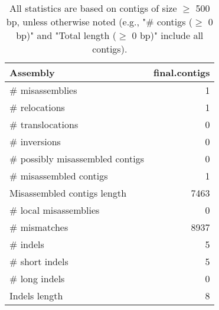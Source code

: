 \documentclass[12pt,a4paper]{article}
\begin{document}
\begin{table}[ht]
\begin{center}
\caption{All statistics are based on contigs of size $\geq$ 500 bp, unless otherwise noted (e.g., "\# contigs ($\geq$ 0 bp)" and "Total length ($\geq$ 0 bp)" include all contigs).}
\begin{tabular}{|l*{1}{|r}|}
\hline
Assembly & final.contigs \\ \hline
\# misassemblies & 1 \\ \hline
\hspace{5mm}\# relocations & 1 \\ \hline
\hspace{5mm}\# translocations & 0 \\ \hline
\hspace{5mm}\# inversions & 0 \\ \hline
\# possibly misassembled contigs & 0 \\ \hline
\# misassembled contigs & 1 \\ \hline
Misassembled contigs length & 7463 \\ \hline
\# local misassemblies & 0 \\ \hline
\# mismatches & 8937 \\ \hline
\# indels & 5 \\ \hline
\hspace{5mm}\# short indels & 5 \\ \hline
\hspace{5mm}\# long indels & 0 \\ \hline
Indels length & 8 \\ \hline
\end{tabular}
\end{center}
\end{table}
\end{document}
